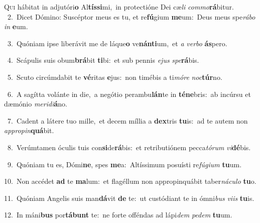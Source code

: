 \lettrine{\initial\textcolor{\initialcolor}{Q}}{ui} hábitat in adjutóri\textbf{o} Al\-\textbf{tís}\-\textbf{si}mi,~\star in protectióne Dei cæ\textit{li} \textit{com}\-\textit{mo}\textbf{rá}bitur.\\
{\numbfont\textcolor{\numbcolor}{~2.}}~Dicet Dómino: Suscéptor meus es tu, et re\-\textbf{fú}\-gium \textbf{me}\-um:~\star Deus meus spe\-\textit{rá}\-\textit{bo} \textit{in} \textbf{e}\-um.\par
{\numbfont\textcolor{\numbcolor}{~3.}}~Quóniam ipse liberávit me de láque\textbf{o} ve\-\textbf{nán}\-\textbf{ti}um,~\star et \textit{a} \textit{ver}\-\textit{bo} \textbf{ás}\-pero.\par
{\numbfont\textcolor{\numbcolor}{~4.}}~Scápulis suis obum\-\textbf{brá}\-bit \textbf{ti}\-bi:~\star et sub pennis \textit{e}\-\textit{jus} \textit{spe}\-\textbf{rá}bis.\par
{\numbfont\textcolor{\numbcolor}{~5.}}~Scuto circúmdabit te \textbf{vé}\-ritas \textbf{e}\-jus:~\star non timébis a ti\-\textit{mó}\-\textit{re} \textit{noc}\-\textbf{túr}no.\par
{\numbfont\textcolor{\numbcolor}{~6.}}~A sagítta volánte in die,~\dagger a negótio perambu\-\textbf{lán}\-te in \textbf{té}\-\textbf{ne}bris:~\star ab incúrsu et dæmónio \textit{me}\-\textit{ri}\textit{di}\textbf{á}no.\par
{\numbfont\textcolor{\numbcolor}{~7.}}~Cadent a látere tuo mille,~\dagger et decem míllia a \textbf{dex}\-tris \textbf{tu}\-is:~\star ad te autem non \textit{ap}\-\textit{pro}\textit{pin}\textbf{quá}bit.\par
{\numbfont\textcolor{\numbcolor}{~8.}}~Verúmtamen óculis tuis con\-\textbf{si}\-de\-\textbf{rá}\-bis:~\star et retributiónem pecca\-\textit{tó}\-\textit{rum} \textit{vi}\-\textbf{dé}bis.\par
{\numbfont\textcolor{\numbcolor}{~9.}}~Quóniam tu es, Dómi\-\textbf{ne}\-, spes \textbf{me}\-a:~\star Altíssimum posuísti re\-\textit{fú}\-\textit{gi}\textit{um} \textbf{tu}\-um.\par
{\numbfont\textcolor{\numbcolor}{10.}}~Non accédet \textbf{ad} te \textbf{ma}\-lum:~\star et flagéllum non appropinquábit taber\-\textit{ná}\-\textit{cu}\textit{lo} \textbf{tu}\-o.\par
{\numbfont\textcolor{\numbcolor}{11.}}~Quóniam Angelis suis man\-\textbf{dá}\-vit \textbf{de} te:~\star ut custódiant te in ómni\textit{bus} \textit{vi}\-\textit{is} \textbf{tu}\-is.\par
{\numbfont\textcolor{\numbcolor}{12.}}~In máni\textbf{bus} por\-\textbf{tá}\-\textbf{bunt} te:~\star ne forte offéndas ad lápi\textit{dem} \textit{pe}\-\textit{dem} \textbf{tu}\-um.\par
